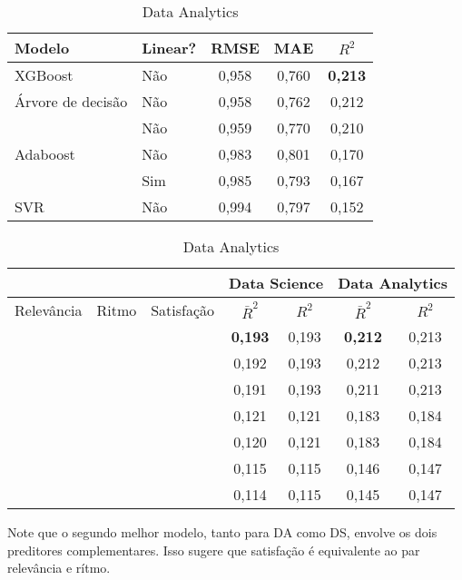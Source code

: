 \begin{table}
	\centering
	\caption{Data Analytics}
	\label{tab:reg-da-1}
	\begin{tabular}{llccc}
		\toprule
		Modelo                  & Linear? & RMSE  &   MAE & $R^2$\\
		\midrule
		XGBoost                 & Não     & 0,958 & 0,760 & \textbf{0,213}\\
		Árvore de decisão       & Não     & 0,958 & 0,762 & 0,212\\
		\foreign{Random Forest} & Não     & 0,959 & 0,770 & 0,210\\
		Adaboost                & Não     & 0,983 & 0,801 & 0,170\\
		\foreign{ElasticNet}    & Sim     & 0,985 & 0,793 & 0,167\\
		SVR                     & Não     & 0,994 & 0,797 & 0,152\\
		\bottomrule
	\end{tabular}
\end{table}

\begin{table}
	\centering
	\caption{Data Analytics}
	\label{tab:reg-da-2}
	\begin{tabular}{ccccccc}
		\toprule
		           &            &            & \multicolumn{2}{c}{Data Science} & \multicolumn{2}{c}{Data Analytics}\\
		\midrule
		Relevância & Ritmo      & Satisfação & $\bar R^2$     & $R^2$ & $\bar R^2$     & $R^2$\\
		\midrule
		           &            & \checkmark & \textbf{0,193} & 0,193 & \textbf{0,212} & 0,213\\
		\checkmark & \checkmark &            & 0,192          & 0,193 & 0,212          & 0,213\\
		\checkmark & \checkmark & \checkmark & 0,191          & 0,193 & 0,211          & 0,213\\
		           & \checkmark &            & 0,121          & 0,121 & 0,183          & 0,184\\
		           & \checkmark & \checkmark & 0,120          & 0,121 & 0,183          & 0,184\\
		\checkmark &            &            & 0,115          & 0,115 & 0,146          & 0,147\\
		\checkmark &            & \checkmark & 0,114          & 0,115 & 0,145          & 0,147\\
		\bottomrule
	\end{tabular}
\end{table}

Note que o segundo melhor modelo, tanto para DA como DS, envolve os dois preditores complementares.
Isso sugere que satisfação é equivalente ao par relevância e rítmo.